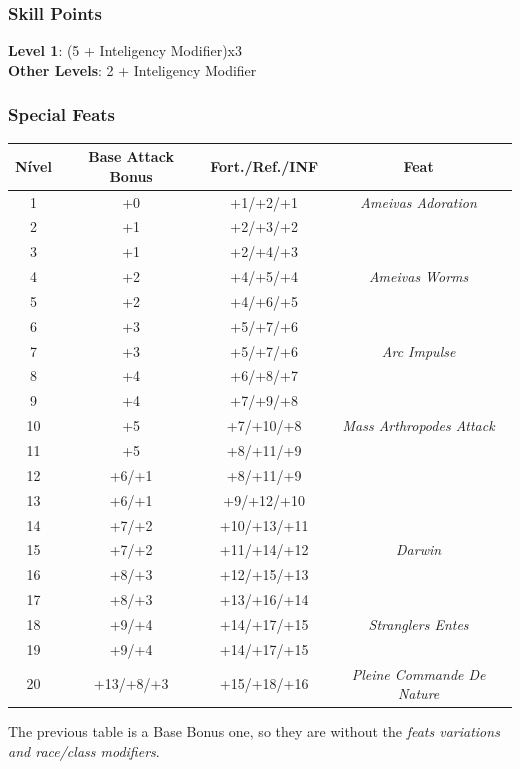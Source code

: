 \documentclass[ letterpaper,12pt]{article}
\begin{document}
\subsubsection{Skill Points}
{\bf Level 1}: (5 + Inteligency Modifier)x3\\
{\bf Other Levels}: 2 + Inteligency Modifier\\

\subsubsection{Special Feats}

\begin{center} \begin{tabular}{|c||c|c|c|}
\hline
{\bf Nível}&{\bf Base Attack Bonus}&{\bf Fort./Ref./INF}&{\bf Feat}\\
\hline
1&+0&+1/+2/+1&{\it Ameivas Adoration}\\
\hline
2&+1&+2/+3/+2&\\
\hline
3&+1&+2/+4/+3&\\
\hline
4&+2&+4/+5/+4&{\it Ameivas Worms}\\
\hline
5&+2&+4/+6/+5&{\it }\\
\hline
6&+3&+5/+7/+6&\\
\hline
7&+3&+5/+7/+6&{\it Arc Impulse}\\
\hline
8&+4&+6/+8/+7&\\
\hline
9&+4&+7/+9/+8&\\
\hline
10&+5&+7/+10/+8&{\it Mass Arthropodes Attack}\\
\hline
11&+5&+8/+11/+9&\\
\hline
12&+6/+1&+8/+11/+9&\\
\hline
13&+6/+1&+9/+12/+10&\\
\hline
14&+7/+2&+10/+13/+11&\\
\hline
15&+7/+2&+11/+14/+12&{\it Darwin }\\
\hline
16&+8/+3&+12/+15/+13&\\
\hline
17&+8/+3&+13/+16/+14&\\
\hline
18&+9/+4&+14/+17/+15&{\it Stranglers Entes}\\
\hline
19&+9/+4&+14/+17/+15&\\
\hline
20&+13/+8/+3&+15/+18/+16&{\it Pleine Commande De Nature }\\
\hline
\end{tabular} \end{center}

The previous table is a Base Bonus one, so they are without the {\it feats variations and race/class modifiers}.\\
\end{document}
